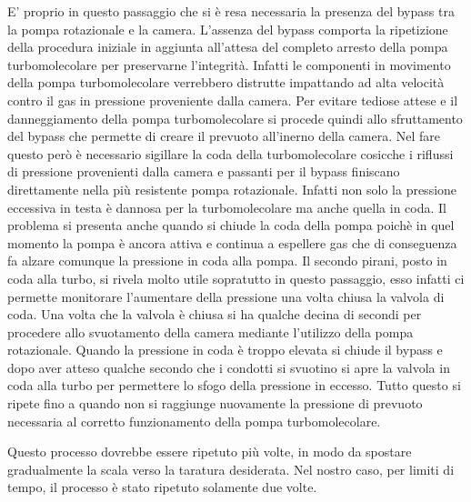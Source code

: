 \documentclass[11pt]{article}
\begin{document}
 E' proprio in questo passaggio che si è resa necessaria la presenza del bypass tra la pompa rotazionale e la camera.
 L'assenza del bypass comporta la ripetizione della procedura iniziale in aggiunta all'attesa del completo arresto della pompa turbomolecolare per preservarne l'integrità. Infatti le componenti in movimento della pompa turbomolecolare verrebbero distrutte impattando ad alta velocità contro il gas in pressione proveniente dalla camera.
 Per evitare tediose attese e il danneggiamento della pompa turbomolecolare si procede quindi allo sfruttamento del bypass che permette di creare il prevuoto all'inerno della camera. Nel fare questo però è necessario sigillare la coda della turbomolecolare cosicche i riflussi di pressione provenienti dalla camera e passanti per il bypass finiscano direttamente nella più resistente pompa rotazionale. Infatti non solo la pressione eccessiva in testa è dannosa per la turbomolecolare ma anche quella in coda. Il problema si presenta anche quando si chiude la coda della pompa poichè in quel momento la pompa è ancora attiva e continua a espellere gas che di conseguenza fa alzare comunque la pressione in coda alla pompa.
 Il secondo pirani, posto in coda alla turbo, si rivela molto utile sopratutto in questo passaggio, esso infatti ci permette monitorare l'aumentare della pressione una volta chiusa la valvola di coda.
 Una volta che la valvola è chiusa si ha qualche decina di secondi per procedere allo svuotamento della camera mediante l'utilizzo della pompa rotazionale.
 Quando la pressione in coda è troppo elevata si chiude il bypass e dopo aver atteso qualche secondo che i condotti si svuotino si apre la valvola in coda alla turbo per permettere lo sfogo della pressione in eccesso.
 Tutto questo si ripete fino a quando non si raggiunge nuovamente la pressione di prevuoto necessaria al corretto funzionamento della pompa turbomolecolare.

 Questo processo dovrebbe essere ripetuto più volte, in modo da spostare gradualmente la scala verso la taratura desiderata. Nel nostro caso, per limiti di tempo, il processo è stato ripetuto solamente due volte. 
\end{document}
